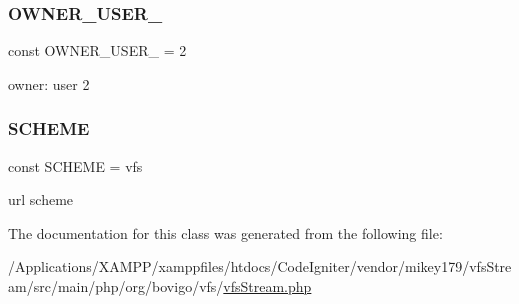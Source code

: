 \subsubsection{\texorpdfstring{O\+W\+N\+E\+R\+\_\+\+U\+S\+E\+R\+\_}{OWNER\_USER\_2}}
{\footnotesize\ttfamily const O\+W\+N\+E\+R\+\_\+\+U\+S\+E\+R\+\_ = 2}

owner\+: user 2 \mbox{\label{classorg_1_1bovigo_1_1vfs_1_1vfs_stream_acd5618ad381307733a7b905783529c28}} 
\subsubsection{\texorpdfstring{S\+C\+H\+E\+ME}{SCHEME}}
{\footnotesize\ttfamily const S\+C\+H\+E\+ME = \textquotesingle{}vfs\textquotesingle{}}

url scheme 

The documentation for this class was generated from the following file\+:\begin{DoxyCompactItemize}
\item 
/\+Applications/\+X\+A\+M\+P\+P/xamppfiles/htdocs/\+Code\+Igniter/vendor/mikey179/vfs\+Stream/src/main/php/org/bovigo/vfs/\mbox{\hyperlink{vfs_stream_8php}{vfs\+Stream.\+php}}\end{DoxyCompactItemize}
